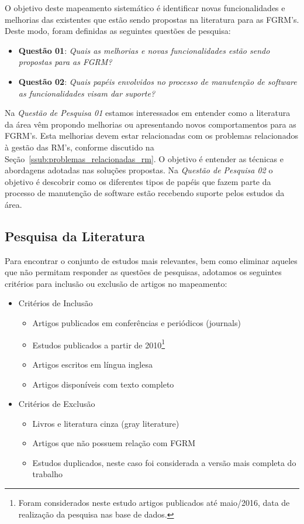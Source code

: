 O objetivo deste mapeamento sistemático é identificar novas funcionalidades e
melhorias das existentes que estão sendo propostas na literatura para as FGRM's.
Deste modo, foram definidas as seguintes questões de pesquisa:

\begin{itemize}
	\item \textbf{Questão 01}: \textit{Quais as melhorias e novas
			funcionalidades estão sendo propostas para as FGRM?}
	\item \textbf{Questão 02}: \textit{Quais papéis envolvidos no processo de
			manutenção de software as funcionalidades visam dar suporte?}
\end{itemize}

Na \textit{Questão de Pesquisa 01} estamos interessados em entender como a
literatura da área vêm propondo melhorias ou apresentando novos comportamentos
para as FGRM's. Esta melhorias devem estar relacionadas com os problemas
relacionados à gestão das RM's, conforme discutido na
Seção~\ref{ssub:problemas_relacionadas_rm}. O objetivo é entender as técnicas e
abordagens adotadas nas soluções propostas. Na \textit{Questão de Pesquisa 02} o
objetivo é descobrir como os diferentes tipos de papéis que fazem parte da
processo de manutenção de software estão recebendo suporte pelos estudos da
área.

\subsection{Pesquisa da Literatura}
\label{subsec:map-pesquisa-literatura}

Para encontrar o conjunto de estudos mais relevantes, bem como eliminar aqueles
que não permitam responder as questões de pesquisas, adotamos os seguintes
critérios para inclusão ou exclusão de artigos no mapeamento:

\begin{itemize}
	\item Critérios de Inclusão
		\begin{itemize}
			\item Artigos
				publicados em conferências e periódicos (journals)
			\item Estudos
				publicados a partir de 2010\footnote{Foram considerados neste
					estudo artigos publicados até maio/2016, data de realização
					da pesquisa nas base de dados.}
			\item Artigos escritos em
				língua inglesa
			\item Artigos disponíveis com texto
				completo
		\end{itemize}
	\item Critérios de Exclusão
		\begin{itemize}
			\item Livros e literatura cinza (gray literature)
			\item Artigos que não possuem relação com FGRM
			\item Estudos duplicados, neste caso foi considerada a versão mais
				completa do trabalho
		\end{itemize}
\end{itemize}

